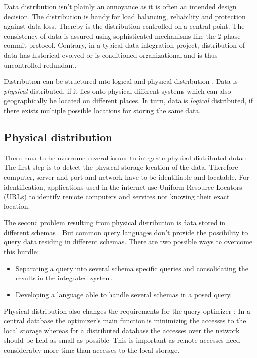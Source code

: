 Data distribution isn't plainly an annoyance as it is often an intended design decision\cite[p. 54]{DBLP:books/dp/LeserN2006}. The distribution is handy for load balancing, reliability and protection against data loss. Thereby is the distribution controlled on a central point. 
The consistency of data is assured using sophisticated mechanisms like the 2-phase-commit protocol\cite[p. 54]{DBLP:books/dp/LeserN2006}. Contrary, in a typical data integration project, distribution of data has historical evolved or is conditioned organizational and is thus uncontrolled redundant.

Distribution can be structured into logical and physical distribution \cite[p. 51]{DBLP:books/dp/LeserN2006}. Data is \textit{physical} distributed, if it lies onto physical different systems which can also geographically be located on different places. In turn, data is \textit{logical} distributed, if there exists multiple possible locations for storing the same data. 

\subsection{Physical distribution}
There have to be overcome several issues to integrate physical distributed data \cite[p. 51]{DBLP:books/dp/LeserN2006}: The first step is to detect the physical storage location of the data. Therefore computer, server and port and network have to be identifiable and locatable. For identification, applications used in the internet use Uniform Resource Locators (URLs) to identify remote computers and services not knowing their exact location.

The second problem resulting from physical distribution is data stored in different schemas \cite[p. 52]{DBLP:books/dp/LeserN2006}. But common query languages don't provide the possibility to query data residing in different schemas. There are two possible ways to overcome this hurdle:
\begin{itemize}
\item Separating a query into several schema specific queries and consolidating the results in the integrated system.
\item Developing a language able to handle several schemas in a posed query.
\end{itemize}

Physical distribution also changes the requirements for the query optimizer \cite[p. 52]{DBLP:books/dp/LeserN2006}: In a central database the optimizer's main function is minimizing  the accesses to the local storage whereas for a distributed database the accesses over the network should be held as small as possible. This is important as remote accesses need considerably more time than accesses to the local storage.  

